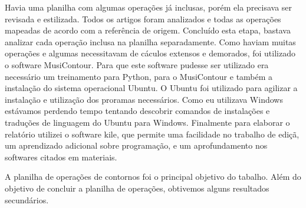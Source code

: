 \documentclass[11pt]{article}
\begin{document}
Havia uma planilha com algumas operações já inclusas, porém ela precisava ser revisada e estilizada.
Todos os artigos foram analizados e todas as operações mapeadas de acordo com a referência de origem.
Concluído esta etapa, bastava analizar cada operação inclusa na planilha separadamente. Como haviam 
muitas operações e algumas necessitavam de cáculos extensos e demorados, foi utilizado o software MusiContour. 
Para que este software pudesse ser utilizado era necessário um treinamento para Python, para o MusiContour 
e também a instalação do sistema operacional Ubuntu. O Ubuntu foi utilizado para agilizar a instalação e 
utilização dos proramas necessários. Como eu utilizava Windows estávamos perdendo tempo tentando descobrir 
comandos de instalações e traduções de linguagem do Ubuntu para Windows.
Finalmente para elaborar o relatório utilizei o software kile, que permite uma facilidade no trabalho
de ediçã, um aprendizado adicional sobre programação, e um aprofundamento nos softwares citados em materiais.

\label{sec:resultados}




A planilha de operações de contornos foi o principal objetivo do tabalho. 
Além do objetivo de concluir a planilha de operações, obtivemos alguns resultados secundários.
\end{document}
